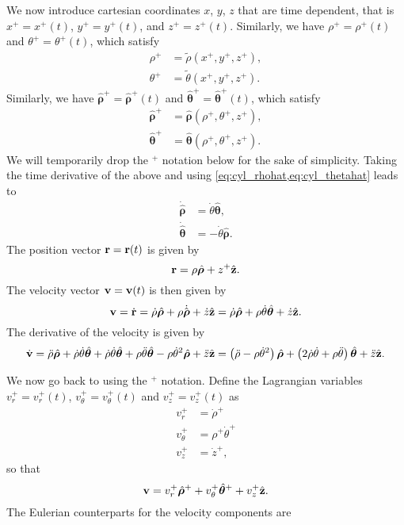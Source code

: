 \documentclass[11pt]{article}
\newcommand{\rhotilde}{\tilde{\rho}}
\newcommand{\thetatilde}{\tilde{\theta}}
\newcommand{\boldrhohat}{\hat{\boldsymbol{\rho}}}
\newcommand{\boldthetahat}{\hat{\boldsymbol{\theta}}}
\begin{document}
We now introduce cartesian coordinates $x$, $y$, $z$ that are time dependent, that is $x^+ = x^+(t)$, $y^+ = y^+(t)$, and $z^+ = z^+(t)$. Similarly, we have $\rho^+ = \rho^+(t)$ and $\theta^+=\theta^+(t)$, which satisfy
\begin{align}
    \rho^+ &= \rhotilde(x^+, y^+, z^+), \\
    \theta^+ &= \thetatilde(x^+, y^+, z^+).
\end{align}
Similarly, we have $\boldrhohat^+ = \boldrhohat^+(t)$ and $\boldthetahat^+=\boldthetahat^+(t)$, which satisfy
\begin{align}
    \boldrhohat^+ &= \boldrhohat(\rho^+, \theta^+, z^+), \\
    \boldthetahat^+ &= \boldthetahat(\rho^+, \theta^+, z^+).
\end{align}
We will temporarily drop the $^+$ notation below for the sake of simplicity. Taking the time derivative of the above and using \cref{eq:cyl_rhohat,eq:cyl_thetahat} leads to
\begin{align}
    \dot{\boldrhohat} &= \dot{\theta} \boldthetahat, \\
    \dot{\boldthetahat} &= -\dot{\theta} \boldrhohat.
\end{align}
The position vector $\mathbf{r} = \mathbf{r}(t)$ is given by
\begin{equation}
    \rvec = \rho \boldrhohat + z^+ \hat{\zvec}.
\end{equation}
The velocity vector $\mathbf{v} = \mathbf{v}(t)$ is then given by
\begin{equation}
    \vvec = \dot{\rvec} = \dot{\rho} \boldrhohat + \rho \dot{\boldrhohat} + \dot{z} \hat{\zvec} = \dot{\rho} \boldrhohat + \rho \dot{\theta} \boldthetahat + \dot{z} \hat{\zvec}.
\end{equation}
The derivative of the velocity is given by
\begin{equation}
    \dot{\vvec} = \ddot{\rho} \boldrhohat + \dot{\rho} \dot{\theta} \boldthetahat + \dot{\rho} \dot{\theta} \boldthetahat + \rho \ddot{\theta} \boldthetahat - \rho \dot{\theta}^2 \boldrhohat + \ddot{z} \hat{\zvec} = \left( \ddot{\rho} - \rho \dot{\theta}^2 \right) \boldrhohat + \left( 2 \dot{\rho} \dot{\theta} + \rho \ddot{\theta} \right) \boldthetahat + \ddot{z} \hat{\zvec}.
\end{equation}

We now go back to using the $^+$ notation. Define the Lagrangian variables $v^+_r = v^+_r(t)$, $v^+_\theta = v^+_\theta(t)$ and $v^+_z = v^+_z(t)$ as 
\begin{align}
    v^+_r &= \dot{\rho}^+ \\
    v^+_\theta & = \rho^+ \dot{\theta}^+ \\
    v^+_z & = \dot{z}^+,
\end{align}
so that
\begin{equation}
    \vvec = v^+_r \boldrhohat^+ + v^+_\theta \boldthetahat^+ + v^+_z \hat{\zvec}.
\end{equation}
The Eulerian counterparts for the velocity components are 
\end{document}
